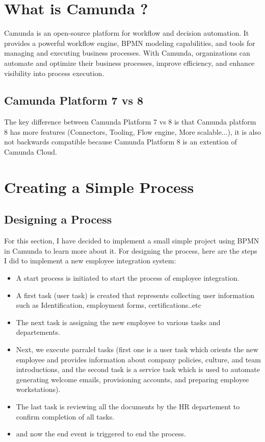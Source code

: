 \documentclass[12pt]{article}
\begin{document}
{  \section{What is Camunda ?}

  Camunda is an open-source platform for workflow and decision automation. It provides a powerful workflow engine, BPMN modeling capabilities, and tools for managing and executing business processes. With Camunda, organizations can automate and optimize their business processes, improve efficiency, and enhance visibility into process execution.

  \subsection{Camunda Platform 7 vs 8}

  The key difference between Camunda Platform 7 vs 8 is that Camunda platform 8 has more features (Connectors, Tooling, Flow engine, More scalable...), it is also not backwards compatible because Camunda Platform 8 is an extention of Camunda Cloud.

  \section{Creating a Simple Process}

  \subsection{Designing a Process}

  For this section, I have decided to implement a small simple project using BPMN in Camunda to learn more about it.
  For designing the process, here are the steps I did to implement a new employee integration system:

  \begin{itemize}[noitemsep,nolistsep]
    \item A start process is initiated to start the process of employee integration.
    \item A first task (user task) is created that represents collecting user information such as Identification, employment forms, certifications..etc
    \item The next task is assigning the new employee to various tasks and departements.
    \item Next, we execute parralel tasks (first one is a user task which orients the new employee and provides information about company policies, culture, and team introductions, and the second task is a service task which is used to automate generating welcome emails, provisioning accounts, and preparing employee workstations).
    \item The last task is reviewing all the documents by the HR departement to confirm completion of all tasks.
    \item and now the end event is triggered to end the process.
  \end{itemize}

}
\end{document}
